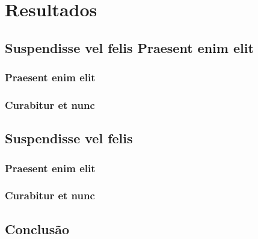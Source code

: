 \documentclass[
	12pt,				%
    oneside,            %
	a4paper,			%
	english,			%
	brazilian,		    %
	]{AcademicoUFT}
\begin{document}
\part{Resultados}

\chapter{Suspendisse vel felis Praesent enim elit}

\section{Praesent enim elit}
\lipsum[6-7] %

\section{Curabitur et nunc}
\lipsum[8-10] %
 
\chapter{Suspendisse vel felis}

\section{Praesent enim elit}
\lipsum[6-7] %

\section{Curabitur et nunc}
\lipsum[8-10] %




\chapter{Conclusão}
\lipsum[31-33] %
\end{document}
